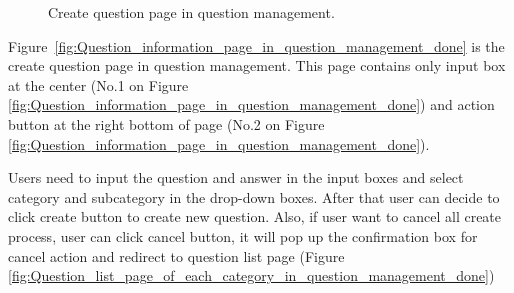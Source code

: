 \documentclass[12pt,oneside,openright,a4paper]{cpe-english-project}
\begin{document}
		\begin{figure}[!h]\centering
			\caption{Create question page in question management.}\label{fig:Create_question_page_in_question_management_done}
		\end{figure}
		\begin{flushleft}
			Figure~\ref*{fig:Question_information_page_in_question_management_done} is the create question page in question management. This page contains only input box at the center (No.1 on Figure \ref*{fig:Question_information_page_in_question_management_done}) and action button at the right bottom of page (No.2 on Figure \ref*{fig:Question_information_page_in_question_management_done}).
		\end{flushleft}
		\begin{flushleft}
			Users need to input the question and answer in the input boxes and select category and subcategory in the drop-down boxes. After that user can decide to click create button to create new question. Also, if user want to cancel all create process, user can click cancel button, it will pop up the confirmation box for cancel action and redirect to question list page (Figure \ref*{fig:Question_list_page_of_each_category_in_question_management_done})
		\end{flushleft}
		
\end{document}
